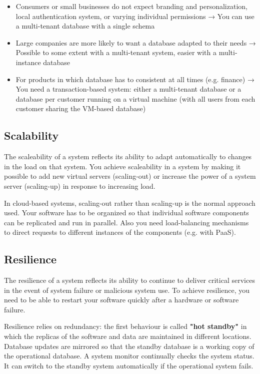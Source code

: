 \documentclass[10pt,a4paper]{report}
\begin{document}
\begin{itemize}
	\item Consumers or small businesses do not expect branding and personalization, local
	authentication system, or varying individual permissions → You can use a multi-tenant
	database with a single schema
	\item Large companies are more likely to want a database adapted to their needs → Possible to
	some extent with a multi-tenant system, easier with a multi-instance database
	\item For products in which database has to consistent at all times (e.g. finance) → You need a
	transaction-based system: either a multi-tenant database or a database per customer
	running on a virtual machine (with all users from each customer sharing the VM-based
	database)
\end{itemize}

\subsection{Scalability}
The scaleability of a system reflects its ability to adapt automatically to
changes in the load on that system.
You achieve scaleability in a system by making it possible to add new
virtual servers (scaling-out) or increase the power of a system server
(scaling-up) in response to increasing load.

In cloud-based systems, scaling-out rather than scaling-up is the normal
approach used. Your software has to be organized so that individual software
components can be replicated and run in parallel. Also you need load-balancing mechanisms to direct requests to different
instances of the components (e.g. with PaaS). 

\subsection{Resilience}
The resilience of a system reflects its ability to continue to deliver critical
services in the event of system failure or malicious system use. To achieve resilience, you need to be able to restart your software quickly after a hardware or software failure.

Resilience relies on redundancy: the first behaviour is called \textbf{"hot standby"} in which the replicas of the software and data are maintained in different locations. Database updates are mirrored so that the standby database is a working copy of the operational database. A system monitor continually checks the system status. It can switch to the
standby system automatically if the operational system fails.
\end{document}
